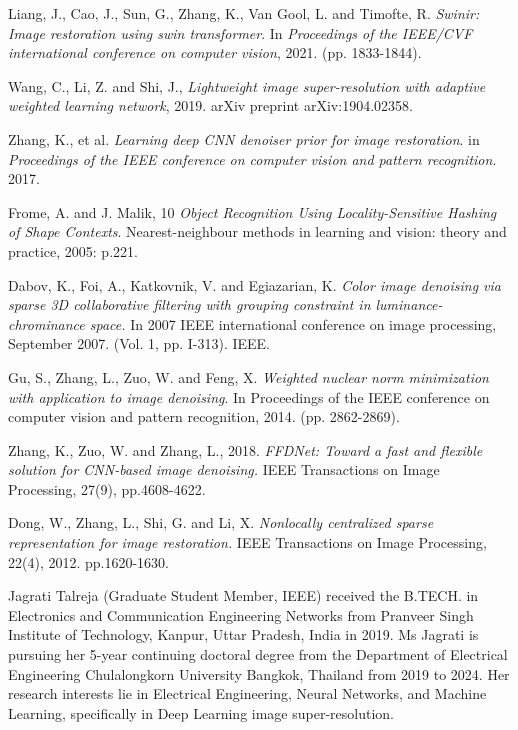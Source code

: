\documentclass{ieeeaccess}
\begin{document}
\begin{thebibliography}{00}
 Liang, J., Cao, J., Sun, G., Zhang, K., Van Gool, L. and Timofte, R. \textit{Swinir: Image restoration using swin transformer}. In \textit{Proceedings of the IEEE/CVF international conference on computer vision}, 2021. (pp. 1833-1844).

 Wang, C., Li, Z. and Shi, J., \textit{Lightweight image super-resolution with adaptive weighted learning network}, 2019. arXiv preprint arXiv:1904.02358.

 Zhang, K., et al. \textit{Learning deep CNN denoiser prior for image restoration}. in \textit{Proceedings of the IEEE conference on computer vision and pattern recognition}. 2017.

 Frome, A. and J. Malik, 10 \textit{Object Recognition Using Locality-Sensitive Hashing of Shape Contexts}. Nearest-neighbour methods in learning and vision: theory and practice, 2005: p.221. 

 Dabov, K., Foi, A., Katkovnik, V. and Egiazarian, K. \textit{Color image denoising via sparse 3D collaborative filtering with grouping constraint in luminance-chrominance space.} In 2007 IEEE international conference on image processing, September 2007. (Vol. 1, pp. I-313). IEEE.

 Gu, S., Zhang, L., Zuo, W. and Feng, X. \textit{Weighted nuclear norm minimization with application to image denoising}. In Proceedings of the IEEE conference on computer vision and pattern recognition, 2014. (pp. 2862-2869).

 Zhang, K., Zuo, W. and Zhang, L., 2018. \textit{FFDNet: Toward a fast and flexible solution for CNN-based image denoising.} IEEE Transactions on Image Processing, 27(9), pp.4608-4622.

 Dong, W., Zhang, L., Shi, G. and Li, X. \textit{Nonlocally centralized sparse representation for image restoration.} IEEE Transactions on Image Processing, 22(4),  2012. pp.1620-1630.


\end{thebibliography}

\begin{IEEEbiography}{Jagrati Talreja} (Graduate Student Member, IEEE) received the B.TECH. in Electronics and Communication Engineering Networks from Pranveer Singh Institute of Technology, Kanpur, Uttar Pradesh, India in 2019. Ms Jagrati is pursuing her 5-year continuing doctoral degree from the Department of Electrical Engineering Chulalongkorn University Bangkok, Thailand from 2019 to 2024. Her research interests lie in Electrical Engineering, Neural Networks, and Machine Learning, specifically in Deep Learning image super-resolution.

\end{IEEEbiography}
\end{document}
